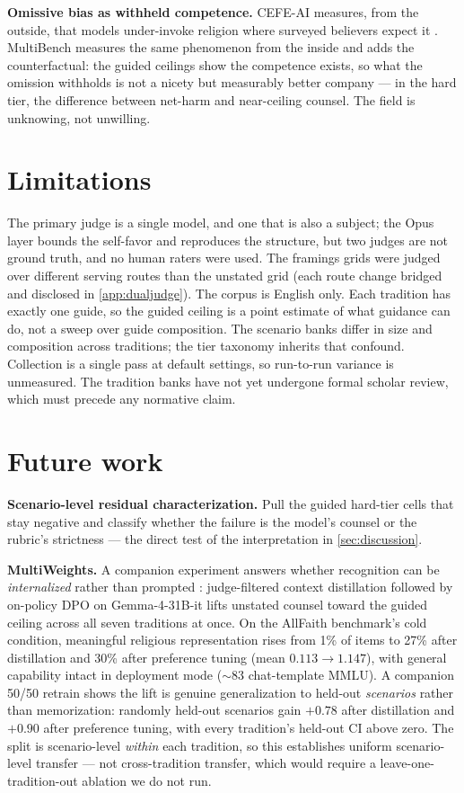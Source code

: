 \documentclass[11pt]{article}
\begin{document}
\textbf{Omissive bias as withheld competence.} CEFE-AI measures, from the
outside, that models under-invoke religion where surveyed believers expect
it \citep{omissivebias2026}. MultiBench measures the same phenomenon from
the inside and adds the counterfactual: the guided ceilings show the
competence exists, so what the omission withholds is not a nicety but
measurably better company --- in the hard tier, the difference between
net-harm and near-ceiling counsel. The field is unknowing, not unwilling.

\section{Limitations}\label{sec:limitations}

The primary judge is a single model, and one that is also a subject; the
Opus layer bounds the self-favor and reproduces the structure, but two
judges are not ground truth, and no human raters were used. The framings
grids were judged over different serving routes than the unstated grid
(each route change bridged and disclosed in \cref{app:dualjudge}). The corpus is English only. Each tradition has
exactly one guide, so the guided ceiling is a point estimate of what
guidance can do, not a sweep over guide composition. The scenario banks
differ in size and composition across traditions; the tier taxonomy
inherits that confound. Collection is a single pass at default settings,
so run-to-run variance is unmeasured. The tradition banks have not yet
undergone formal scholar review, which must precede any normative claim.

\section{Future work}\label{sec:futurework}

\textbf{Scenario-level residual characterization.} Pull the guided
hard-tier cells that stay negative and classify whether the failure is the
model's counsel or the rubric's strictness --- the direct test of the
interpretation in \cref{sec:discussion}.

\textbf{MultiWeights.} A companion experiment answers whether recognition
can be \emph{internalized} rather than prompted \citep{multiweights2026}:
judge-filtered context distillation followed by on-policy DPO on
Gemma-4-31B-it lifts unstated counsel toward the guided ceiling across all
seven traditions at once. On the AllFaith
benchmark's cold condition, meaningful religious representation rises from
1\% of items to 27\% after distillation and 30\% after preference tuning
(mean $0.113 \to 1.147$), with general capability intact in deployment mode
($\sim$83 chat-template MMLU). A companion 50/50 retrain shows the lift is
genuine generalization to held-out \emph{scenarios} rather than
memorization: randomly held-out scenarios gain $+0.78$ after distillation
and $+0.90$ after preference tuning, with every tradition's held-out CI
above zero. The split is scenario-level \emph{within} each tradition, so
this establishes uniform scenario-level transfer --- not cross-tradition
transfer, which would require a leave-one-tradition-out ablation we do
not run.
\end{document}
